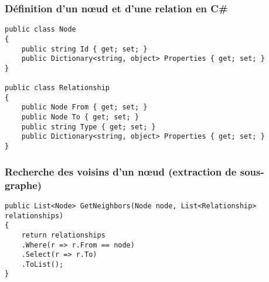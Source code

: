 \documentclass{beamer}
\begin{document}
\begin{frame}[fragile]
  \frametitle{Définition d’un nœud et d’une relation en C\#}

\begin{lstlisting}
public class Node
{
    public string Id { get; set; }
    public Dictionary<string, object> Properties { get; set; }
}

public class Relationship
{
    public Node From { get; set; }
    public Node To { get; set; }
    public string Type { get; set; }
    public Dictionary<string, object> Properties { get; set; }
}
\end{lstlisting}
\end{frame}

\begin{frame}[fragile]
  \frametitle{Recherche des voisins d’un nœud (extraction de sous-graphe)}
\begin{lstlisting}
public List<Node> GetNeighbors(Node node, List<Relationship> relationships)
{
    return relationships
    .Where(r => r.From == node)
    .Select(r => r.To)
    .ToList();
}
\end{lstlisting}
\end{frame}
\end{document}
